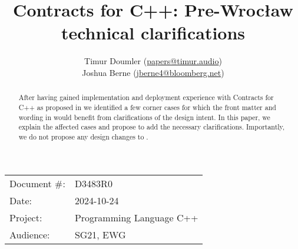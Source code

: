 

 \usepackage[bottom]{footmisc} 

 \usepackage{longtable}


\usepackage{tikz,lipsum,lmodern}
\usepackage[most]{tcolorbox}



\usepackage{titlesec}
\usepackage{tocloft}


\newcommand{\changelocaltocdepth}[1]{%
  \addtocontents{toc}{\protect\setcounter{tocdepth}{#1}}%
  \setcounter{tocdepth}{#1}%
}

\setcounter{tocdepth}{3}



\title{Contracts for C++: Pre-Wroc\l aw technical clarifications}
\author{
Timur Doumler \small(\href{mailto:papers@timur.audio}{papers@timur.audio}) \\
Joshua Berne \small(\href{mailto:jberne4@bloomberg.net}{jberne4@bloomberg.net}) \\
}
\date{}
\maketitle

\begin{tabular}{ll}
Document \#: & D3483R0 \\
Date: &2024-10-24 \\
Project: & Programming Language C++ \\
Audience: & SG21, EWG
\end{tabular}

\begin{abstract}
After having gained implementation and deployment experience with Contracts for C++ as proposed in \cite{P2900R10} we identified a few corner cases for which the front matter and wording in \cite{P2900R10} would benefit from clarifications of the design intent. In this paper, we explain the affected cases and propose to add the necessary clarifications. Importantly, we do not propose any design changes to \cite{P2900R10}.
\end{abstract}

